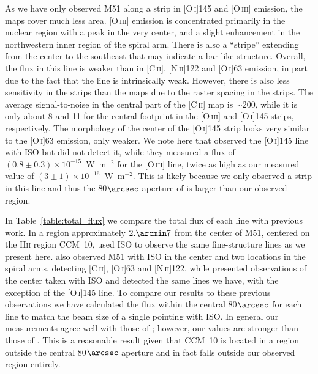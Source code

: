 \documentclass[preprint2]{aastex}
\begin{document}
As we have only observed M51 along a strip in [O\,\textsc{i}]145 and [O\,\textsc{iii}] emission, the maps cover much less area.  [O\,\textsc{iii}] emission is concentrated primarily in the nuclear region with a peak in the very center, and a slight enhancement in the northwestern inner region of the spiral arm.  There is also a ``stripe'' extending from the center to the southeast that may indicate a bar-like structure.  Overall, the flux in this line is weaker than in [C\,\textsc{ii}], [N\,\textsc{ii}]122 and [O\,\textsc{i}]63 emission, in part due to the fact that the line is intrinsically weak.  However, there is also less sensitivity in the strips than the maps due to the raster spacing in the strips.  The average signal-to-noise in the central part of the [C\,\textsc{ii}] map is $\sim$200, while it is only about 8 and 11 for the central footprint in the [O\,\textsc{iii}] and [O\,\textsc{i}]145 strips, respectively.  The morphology of the center of the [O\,\textsc{i}]145 strip looks very similar to the [O\,\textsc{i}]63 emission, only weaker.  We note here that \citet{2001A&A...375..566N} observed the [O\,\textsc{i}]145 line with ISO but did not detect it, while they measured a flux of $(0.8 \pm 0.3) \times 10^{-15}$~W~m$^{-2}$ for the [O\,\textsc{iii}] line, twice as high as our measured value of $(3 \pm 1) \times 10^{-16}$~W~m$^{-2}$.  This is likely because we only observed a strip in this line and thus the 80$\arcsec$ aperture of \citet{2001A&A...375..566N} is larger than our observed region.

In Table~\ref{table:total_flux} we compare the total flux of each line with previous work.  In a region approximately $2.\arcmin7$ from the center of M51, centered on the H\textsc{ii} region CCM~10, \citet{2004AJ....128.2772G} used ISO to observe the same fine-structure lines as we present here.  \citet{2005A&A...441..961K} also observed M51 with ISO in the center and two locations in the spiral arms, detecting [C\,\textsc{ii}], [O\,\textsc{i}]63 and [N\,\textsc{ii}]122, while \citet{2001A&A...375..566N} presented observations of the center taken with ISO and detected the same lines we have, with the exception of the [O\,\textsc{i}]145 line.  To compare our results to these previous observations we have calculated the flux within the central 80$\arcsec$ for each line to match the beam size of a single pointing with ISO.  In general our measurements agree well with those of \citet{2001A&A...375..566N}; however, our values are stronger than those of \citet{2004AJ....128.2772G}.  This is a reasonable result given that CCM~10 is located in a region outside the central 80$\arcsec$ aperture and in fact falls outside our observed region entirely.
\end{document}
